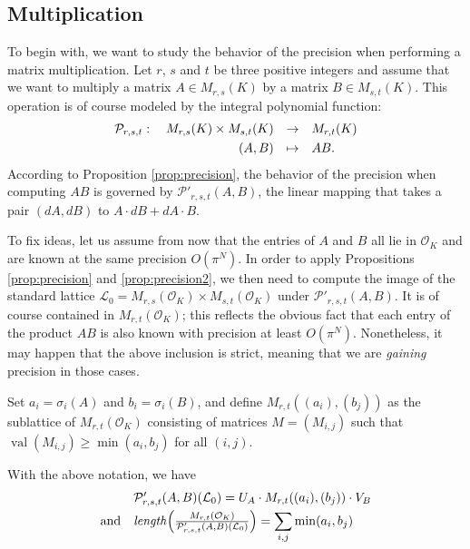 \documentclass{sig-alternate-2013}
\DeclareMathOperator{\val}{val}
\renewcommand{\O}{\mathcal O}
\begin{document}
\subsection{Multiplication}
\label{ssec:mulmatrix}

To begin with, we want to study the behavior of the precision when 
performing a matrix multiplication. Let $r$, $s$ and $t$ be three 
positive integers and assume that we want to multiply a matrix $A \in 
M_{r,s}(K)$ by a matrix $B \in M_{s,t}(K)$. This operation is of course 
modeled by the integral polynomial function:
$$\begin{array}{rcl}
\mathcal P_{r,s,t} : \quad M_{r,s}(K) \times M_{s,t}(K) & \to & 
M_{r,t}(K) \smallskip \\
(A,B) & \mapsto & AB.
\end{array}$$
According to Proposition \ref{prop:precision}, the behavior of the precision when 
computing $AB$ is governed by $\mathcal P'_{r,s,t}(A,B)$, the linear mapping that takes a pair 
$(dA,dB)$ to $A \cdot dB + dA \cdot B$.

To fix ideas, let us assume from now that the entries of $A$ and $B$ all 
lie in $\O_K$ and are known at the same precision $O(\pi^N)$. In order 
to apply Propositions \ref{prop:precision} and \ref{prop:precision2}, we then need to compute the image 
of the standard lattice $\mathcal L_0 = M_{r,s}(\O_K) \times 
M_{s,t}(\O_K)$ under $\mathcal P'_{r,s,t}(A,B)$. It is of course 
contained in $M_{r,t}(\O_K)$; this reflects the obvious fact that each 
entry of the product $AB$ is also known with precision at least $O(\pi^N)$. 
Nonetheless, it may happen that the above inclusion is strict, meaning 
that we are \emph{gaining} precision in those cases.

Set $a_i = \sigma_i(A)$ and $b_i = \sigma_i(B)$, and define $M_{r,t}((a_i),(b_j))$ 
as the sublattice of $M_{r,t}(\O_K)$ consisting of matrices $M = (M_{i,j})$ 
such that $\val(M_{i,j}) \geq \min(a_i,b_j)$ for all $(i,j)$.  

\begin{prop}
\label{prop:mulmatrix}
With the above notation, we have
\[
\begin{array}{rl}
& \mathcal P'_{r,s,t}(A,B)(\mathcal L_0)
= U_A \cdot M_{r,t}((a_i),(b_j)) \cdot V_B \smallskip \\
\text{and} &
\text{\emph{length}}\Big(\frac{M_{r,t}(\O_K)}{\mathcal P'_{r,s,t}(A,B)(\mathcal L_0) }
\Big) =
\displaystyle 
\sum_{i,j} \min(a_i,b_j)
\end{array}
\]
\end{prop}
\end{document}

